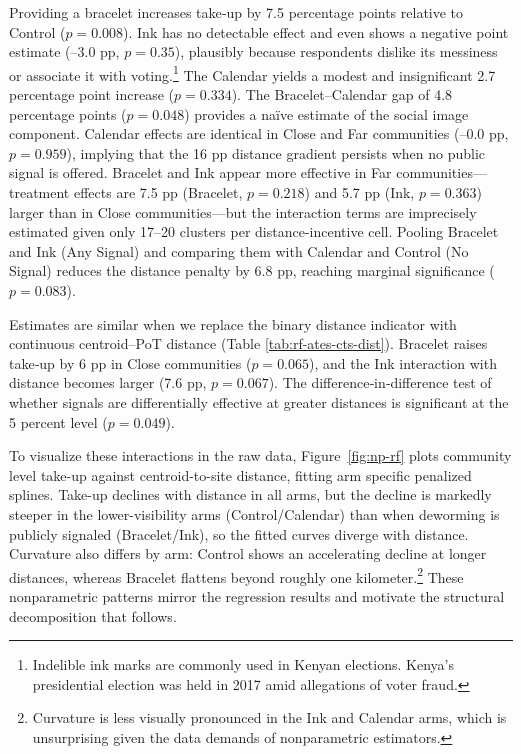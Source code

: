 \documentclass[12pt,a4paper]{article}
\begin{document}
Providing a bracelet increases take‑up by 7.5 percentage points relative to Control ($p = 0.008$).  Ink has no detectable effect and even shows a negative point estimate (–3.0 pp, $p = 0.35$), plausibly because respondents dislike its messiness or associate it with voting.\footnote{Indelible ink marks are commonly used in Kenyan elections. Kenya’s presidential election was held in 2017 amid allegations of voter fraud.} The Calendar yields a modest and insignificant 2.7 percentage point increase ($p = 0.334$). The Bracelet–Calendar gap of 4.8 percentage points ($p = 0.048$) provides a naïve estimate of the social image component. Calendar effects are identical in Close and Far communities (–0.0 pp, $p = 0.959$), implying that the 16 pp distance gradient persists when no public signal is offered.  Bracelet and Ink appear more effective in Far communities—treatment effects are 7.5 pp (Bracelet, $p = 0.218$) and 5.7 pp (Ink, $p = 0.363$) larger than in Close communities—but the interaction terms are imprecisely estimated given only 17–20 clusters per distance-incentive cell. Pooling Bracelet and Ink (Any Signal) and comparing them with Calendar and Control (No Signal) reduces the distance penalty by 6.8 pp, reaching marginal significance ($p = 0.083$).

Estimates are similar when we replace the binary distance indicator with continuous centroid–PoT distance (Table \ref{tab:rf-ates-cts-dist}).  Bracelet raises take‑up by 6 pp in Close communities ($p = 0.065$), and the Ink interaction with distance becomes larger (7.6 pp, $p = 0.067$).  The difference‑in‑difference test of whether signals are differentially effective at greater distances is significant at the 5 percent level ($p = 0.049$).


To visualize these interactions in the raw data, Figure~\ref{fig:np-rf} plots community level take-up against centroid-to-site distance, fitting arm specific penalized splines. Take-up declines with distance in all arms, but the decline is markedly steeper in the lower-visibility arms (Control/Calendar) than when deworming is publicly signaled (Bracelet/Ink), so the fitted curves diverge with distance. Curvature also differs by arm: Control shows an accelerating decline at longer distances, whereas Bracelet flattens beyond roughly one kilometer.\footnote{Curvature is less visually pronounced in the Ink and Calendar arms, which is unsurprising given the data demands of nonparametric estimators.} These nonparametric patterns mirror the regression results and motivate the structural decomposition that follows. %
\end{document}
